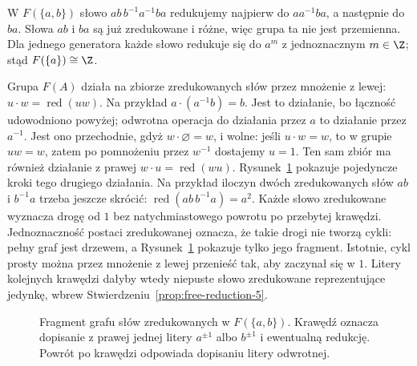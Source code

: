 \begin{przyklad}
\label{prz:redukcja-slow-5}
W $F(\{a,b\})$ słowo
$ab\,b^{-1}a^{-1}ba$
redukujemy najpierw do
$aa^{-1}ba$, a następnie
do $ba$. Słowa $ab$ i $ba$
są już zredukowane i różne,
więc grupa ta nie jest przemienna.
Dla jednego generatora każde słowo
redukuje się do $a^m$ z jednoznacznym
$m\in\Z$; stąd $F(\{a\})\cong\Z$.

Grupa $F(A)$ działa na zbiorze zredukowanych
słów przez mnożenie z lewej:
$u\cdot w=\operatorname{red}(uw)$.
Na przykład $a\cdot(a^{-1}b)=b$.
Jest to działanie, bo łączność udowodniono
powyżej; odwrotna operacja do działania
przez $a$ to działanie przez $a^{-1}$.
Jest ono przechodnie, gdyż $w\cdot\varnothing=w$,
i wolne: jeśli $u\cdot w=w$, to w grupie
$uw=w$, zatem po pomnożeniu przez $w^{-1}$
dostajemy $u=1$. Ten sam zbiór ma również
działanie z prawej $w\cdot u=\operatorname{red}(wu)$.
Rysunek~\ref{fig:free-words-5} pokazuje
pojedyncze kroki tego drugiego działania.
Na przykład iloczyn dwóch zredukowanych słów
$ab$ i $b^{-1}a$ trzeba jeszcze skrócić:
$\operatorname{red}(ab\,b^{-1}a)=a^2$.
Każde słowo zredukowane wyznacza drogę od $1$ bez natychmiastowego
powrotu po przebytej krawędzi. Jednoznaczność postaci zredukowanej
oznacza, że takie drogi nie tworzą cykli: pełny graf jest drzewem,
a Rysunek~\ref{fig:free-words-5} pokazuje tylko jego fragment.
Istotnie, cykl prosty można przez mnożenie z lewej przenieść tak,
aby zaczynał się w $1$. Litery kolejnych krawędzi dałyby wtedy
niepuste słowo zredukowane reprezentujące jedynkę, wbrew
Stwierdzeniu~\ref{prop:free-reduction-5}.
\end{przyklad}

\begin{figure}[htbp]
\centering
{}
\caption{Fragment grafu słów zredukowanych w
$F(\{a,b\})$. Krawędź oznacza dopisanie
z prawej jednej litery $a^{\pm1}$ albo $b^{\pm1}$
i ewentualną redukcję. Powrót po krawędzi
odpowiada dopisaniu litery odwrotnej.}
\label{fig:free-words-5}
\end{figure}

